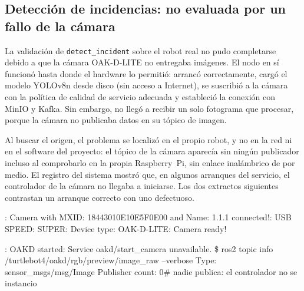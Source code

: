 \subsection{Detección de incidencias: no evaluada por un fallo de la cámara}
\label{sec:real-deteccion}

La validación de \texttt{detect\_incident} sobre el robot real no pudo completarse debido a que la cámara
OAK-D-LITE no entregaba imágenes. El nodo en sí funcionó hasta donde el hardware lo permitió:
arrancó correctamente, cargó el modelo YOLOv8n desde disco (sin acceso a Internet), se suscribió a
la cámara con la política de calidad de servicio adecuada y estableció la conexión con MinIO y
Kafka. Sin embargo, no llegó a recibir un solo fotograma que procesar, porque la cámara no
publicaba datos en su tópico de imagen.

Al buscar el origen, el problema se localizó en el propio robot, y no en la red ni en el software
del proyecto: el tópico de la cámara aparecía sin ningún publicador incluso al comprobarlo en la
propia Raspberry~Pi, sin enlace inalámbrico de por medio. El registro del sistema mostró que, en
algunos arranques del servicio, el controlador de la cámara no llegaba a iniciarse. Los dos
extractos siguientes contrastan un arranque correcto con uno defectuoso.

\begin{terminal}: Camera with MXID: 18443010E10E5F0E00 and Name: 1.1.1 connected!: USB SPEED: SUPER: Device type: OAK-D-LITE: Camera ready!
\end{terminal}

\begin{terminal}: OAKD started: Service oakd/start\_camera unavailable.\newline
\newline
\$ ros2 topic info /turtlebot4/oakd/rgb/preview/image\_raw --verbose\newline
Type: sensor\_msgs/msg/Image\newline
Publisher count: 0\quad\# nadie publica: el controlador no se instancio
\end{terminal}

